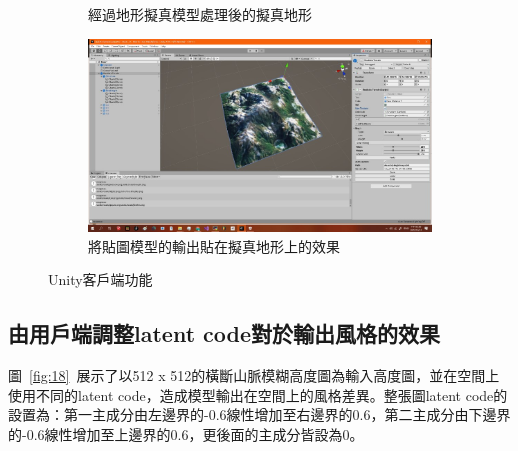\documentclass[a4paper, 12pt]{article}
\begin{document}
\begin{figure}
\begin{subfigure}[b]{0.475\textwidth}
    \caption[]%
    {{\small 經過地形擬真模型處理後的擬真地形}}    
    \label{fig:16}
\end{subfigure}
\hfill
\begin{subfigure}[b]{0.475\textwidth}   
    \centering 
    \includegraphics[width=\textwidth]{fig/17.jpg}
    \caption[]%
    {{\small 將貼圖模型的輸出貼在擬真地形上的效果}}    
    \label{fig:17}
\end{subfigure}
\caption[ The average and standard deviation of critical parameters ]
{\small Unity客戶端功能} 
\label{fig:unity}
\end{figure}



%
%
%

\subsection{由用戶端調整latent code對於輸出風格的效果}
圖~\ref{fig:18}~展示了以512 x 512的橫斷山脈模糊高度圖為輸入高度圖，並在空間上使用不同的latent code，造成模型輸出在空間上的風格差異。整張圖latent code的設置為：第一主成分由左邊界的-0.6線性增加至右邊界的0.6，第二主成分由下邊界的-0.6線性增加至上邊界的0.6，更後面的主成分皆設為0。
\end{document}
